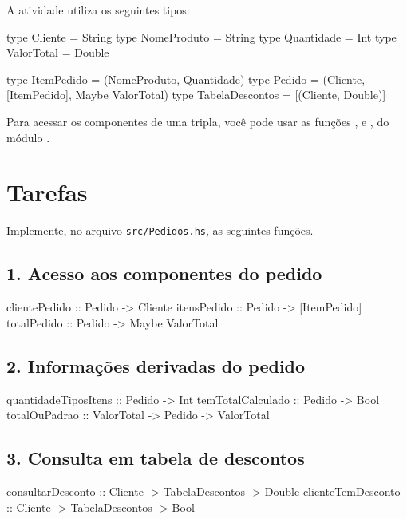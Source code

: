 \documentclass{article}
\begin{document}
A atividade utiliza os seguintes tipos:

\begin{haskellcode}
type Cliente = String
type NomeProduto = String
type Quantidade = Int
type ValorTotal = Double

type ItemPedido = (NomeProduto, Quantidade)
type Pedido = (Cliente, [ItemPedido], Maybe ValorTotal)
type TabelaDescontos = [(Cliente, Double)]
\end{haskellcode}

Para acessar os componentes de uma tripla, você pode usar as funções
,  e , do módulo
.

\section{Tarefas}

Implemente, no arquivo \texttt{src/Pedidos.hs}, as seguintes funções.

\subsection*{1. Acesso aos componentes do pedido}

\begin{haskellcode}
clientePedido :: Pedido -> Cliente
itensPedido :: Pedido -> [ItemPedido]
totalPedido :: Pedido -> Maybe ValorTotal
\end{haskellcode}

\subsection*{2. Informações derivadas do pedido}

\begin{haskellcode}
quantidadeTiposItens :: Pedido -> Int
temTotalCalculado :: Pedido -> Bool
totalOuPadrao :: ValorTotal -> Pedido -> ValorTotal
\end{haskellcode}

\subsection*{3. Consulta em tabela de descontos}

\begin{haskellcode}
consultarDesconto :: Cliente -> TabelaDescontos -> Double
clienteTemDesconto :: Cliente -> TabelaDescontos -> Bool
\end{haskellcode}
\end{document}
